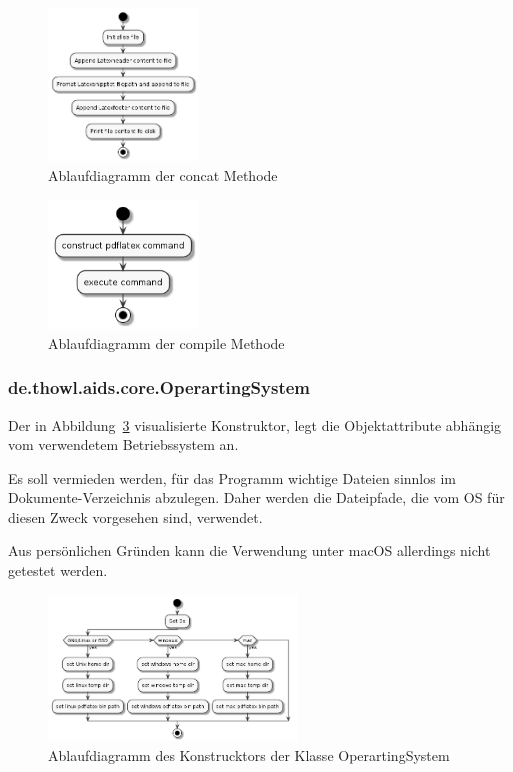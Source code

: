 \documentclass[stu, a4paper, 11pt, floatsintext]{apa7}
\begin{document}
\begin{figure}[!htbp]
\centering
\includegraphics[width=150px]{../technical_documentation/diagramm/uml/flowcharts/core/latex/concat.png}
\caption{\label{concat-methode}Ablaufdiagramm der concat Methode}
\end{figure}

\begin{figure}[!htbp]
\centering
\includegraphics[width=150px]{../technical_documentation/diagramm/uml/flowcharts/core/latex/compile.png}
\caption{\label{compile-methode}Ablaufdiagramm der compile Methode}
\end{figure}

\subsubsection{de.thowl.aids.core.OperartingSystem}
\noindent Der in Abbildung~\ref{os-construcktor} visualisierte Konstruktor, legt die Objektattribute abhängig vom verwendetem Betriebssystem an.

Es soll vermieden werden, für das Programm wichtige Dateien sinnlos im Dokumente-Verzeichnis abzulegen. Daher werden die Dateipfade, die vom OS für diesen Zweck vorgesehen sind, verwendet.

Aus persönlichen Gründen kann die Verwendung unter macOS allerdings nicht getestet werden.

\begin{figure}[!htbp]
\centering
\includegraphics[width=250px]{../technical_documentation/diagramm/uml/flowcharts/core/os/construcktor.png}
\caption{\label{os-construcktor}Ablaufdiagramm des Konstrucktors der Klasse OperartingSystem}
\end{figure}
\end{document}
